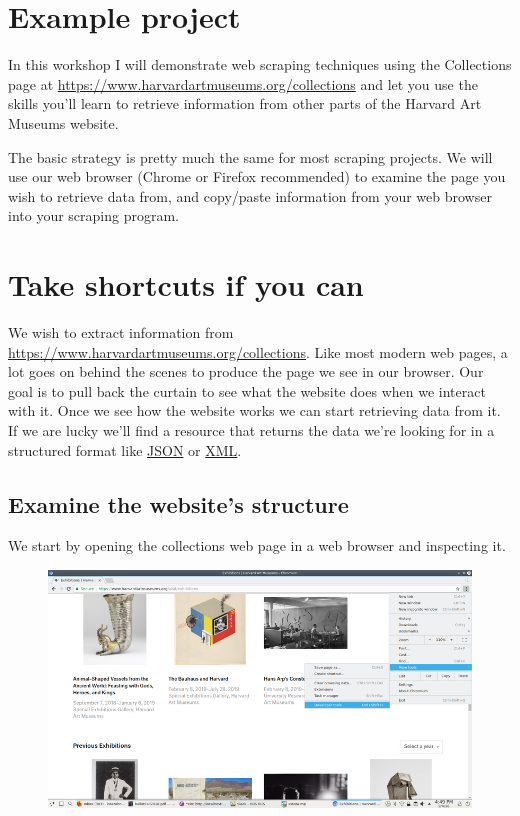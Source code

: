 \documentclass[]{book}
\begin{document}
\section{Example project}\label{example-project}

In this workshop I will demonstrate web scraping techniques using the
Collections page at \url{https://www.harvardartmuseums.org/collections}
and let you use the skills you'll learn to retrieve information from
other parts of the Harvard Art Museums website.

The basic strategy is pretty much the same for most scraping projects.
We will use our web browser (Chrome or Firefox recommended) to examine
the page you wish to retrieve data from, and copy/paste information from
your web browser into your scraping program.

\section{Take shortcuts if you can}\label{take-shortcuts-if-you-can}

We wish to extract information from
\url{https://www.harvardartmuseums.org/collections}. Like most modern
web pages, a lot goes on behind the scenes to produce the page we see in
our browser. Our goal is to pull back the curtain to see what the
website does when we interact with it. Once we see how the website works
we can start retrieving data from it. If we are lucky we'll find a
resource that returns the data we're looking for in a structured format
like \href{https://json.org/}{JSON} or
\href{https://en.wikipedia.org/wiki/XML}{XML}.

\subsection{Examine the website's
structure}\label{examine-the-websites-structure}

We start by opening the collections web page in a web browser and
inspecting it.

\begin{figure}
\centering
\includegraphics{Python/PythonWebScrape/images/dev_tools.png}
\caption{}
\end{figure}
\end{document}
